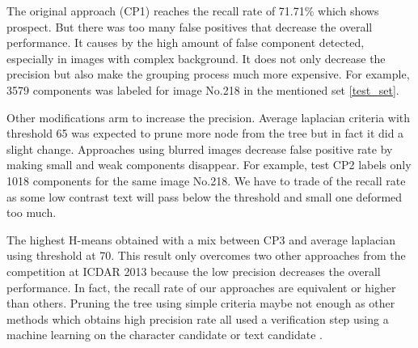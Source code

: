 The original approach (CP1) reaches the recall rate of 71.71\% which shows prospect. But there was too many false positives that decrease the overall performance. It causes by the high amount of false component detected, especially in images with complex background. It does not only decrease the precision but also make the grouping process much more expensive. For example, 3579 components was labeled for image No.218 in the mentioned set \ref{test_set}.


Other modifications arm to increase the precision. Average laplacian criteria with threshold 65 was expected to prune more node from the tree but in fact it did a slight change. Approaches using blurred images decrease false positive rate by making small and weak components disappear. For example, test CP2 labels only 1018 components for the same image No.218. We have to trade of the recall rate as some low contrast text will pass below the threshold and small one deformed too much.


The highest H-means obtained with a mix between CP3 and average laplacian using threshold at 70. This result only overcomes two other approaches from the competition at ICDAR 2013 \cite{ICDAR2013} because the low precision decreases the overall performance. In fact, the recall rate of our approaches are equivalent or higher than others. Pruning the tree using simple criteria maybe not enough as other methods which obtains high precision rate all used a verification step using a machine learning on the character candidate or text candidate .

